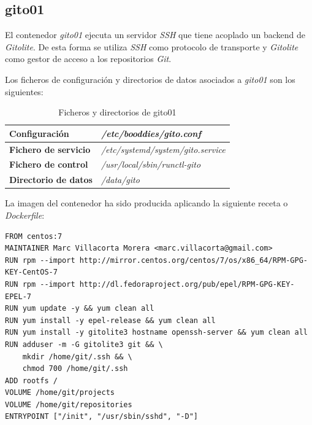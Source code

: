 \documentclass[a4paper,12pt,spanish,final]{epsc_tfc_pfc}
\begin{document}
\subsection{gito01}

El contenedor \emph{gito01} ejecuta un servidor \emph{SSH} que tiene acoplado un backend de \emph{Gitolite}. De esta forma se utiliza \emph{SSH} como protocolo de transporte y \emph{Gitolite} como gestor de acceso a los repositorios \emph{Git}.

Los ficheros de configuración y directorios de datos asociados a \emph{gito01} son los siguientes:
\begin{table}[h]

  \centering

  \begin{tabular}{ll}
    \toprule
    \textbf{Configuración}        & \textit{/etc/booddies/gito.conf}          \\
    \midrule
    \rowcolor[HTML]{EFEFEF}
    \textbf{Fichero de servicio}  & \textit{/etc/systemd/system/gito.service} \\
    \midrule
    \textbf{Fichero de control}   & \textit{/usr/local/sbin/runctl-gito}      \\
    \midrule
    \rowcolor[HTML]{EFEFEF}
    \textbf{Directorio de datos}  & \textit{/data/gito}                       \\
    \bottomrule
  \end{tabular}

  \caption{Ficheros y directorios de gito01}

\end{table}

La imagen del contenedor ha sido producida aplicando la siguiente receta o \emph{Dockerfile}:\\

\begin{lstlisting}[style=dnsmasq]
FROM centos:7
MAINTAINER Marc Villacorta Morera <marc.villacorta@gmail.com>
RUN rpm --import http://mirror.centos.org/centos/7/os/x86_64/RPM-GPG-KEY-CentOS-7
RUN rpm --import http://dl.fedoraproject.org/pub/epel/RPM-GPG-KEY-EPEL-7
RUN yum update -y && yum clean all
RUN yum install -y epel-release && yum clean all
RUN yum install -y gitolite3 hostname openssh-server && yum clean all
RUN adduser -m -G gitolite3 git && \
    mkdir /home/git/.ssh && \
    chmod 700 /home/git/.ssh
ADD rootfs /
VOLUME /home/git/projects
VOLUME /home/git/repositories
ENTRYPOINT ["/init", "/usr/sbin/sshd", "-D"]
\end{lstlisting}
\end{document}
